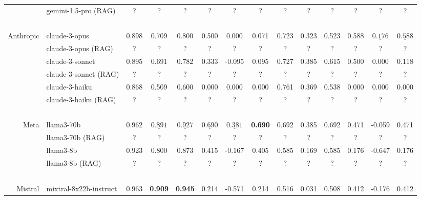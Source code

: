 \begin{table*}[ht]
\begin{tabular}{r|lccc|ccc|ccc|ccc}
        ~       & gemini-1.5-pro (RAG)   & ?              & ?      & ?     & ?     & ?      & ?     & ?     & ?     & ?     & ?     & ?      & ?     \\ 
        ~       & ~                      & ~ & ~ & ~ & ~  & ~ & ~ & ~ & ~ & ~ & ~  & ~ & ~ \\
        Anthropic & claude-3-opus        & 0.898 & 0.709  & 0.800 & 0.500 & 0.000  & 0.071 & 0.723 & 0.323 & 0.523 & 0.588 & $\underline{0.176}$  & $\underline{0.588}$\\ 
        ~         & claude-3-opus (RAG)  & ?              & ?      & ?     & ?     & ?      & ?     & ?     & ?     & ?     & ?     & ?      & ?     \\ 
        ~         & claude-3-sonnet      & 0.895 & 0.691  & 0.782 & 0.333 & -0.095 & 0.095 & 0.727 & 0.385 & 0.615 & 0.500 & 0.000  & 0.118\\ 
         ~        & claude-3-sonnet (RAG)& ?              & ?      & ?     & ?     & ?      & ?     & ?     & ?     & ?     & ?     & ?      & ?     \\ 
        ~         & claude-3-haiku       & 0.868 & 0.509  & 0.600 & 0.000  & 0.000 & 0.000 & 0.761 & 0.369 & 0.538 & 0.000 & 0.000  & 0.000\\ 
         ~        & claude-3-haiku (RAG) & ?              & ?      & ?     & ?     & ?      & ?     & ?     & ?     & ?     & ?     & ?      & ?     \\ 
        ~         & ~                    & ~ & ~ & ~ & ~  & ~ & ~ & ~ & ~ & ~ & ~  & ~ & ~ \\
        Meta    & llama3-70b             & 0.962 & $\underline{0.891}$  & $\underline{0.927}$ & $\underline{0.690}$ & $\underline{0.381}$  & \textbf{0.690} & 0.692 & 0.385 & 0.692 & 0.471 & -0.059 & 0.471\\ 
         ~      & llama3-70b (RAG)       & ?              & ?      & ?     & ?     & ?      & ?     & ?     & ?     & ?     & ?     & ?      & ?     \\ 
        ~       & llama3-8b              & 0.923 & 0.800  & 0.873 & 0.415 & -0.167 & 0.405 & 0.585 & 0.169 & 0.585 & 0.176 & -0.647 & 0.176 \\ 
         ~      & llama3-8b (RAG)        & ?              & ?      & ?     & ?     & ?      & ?     & ?     & ?     & ?     & ?     & ?      & ?     \\ 
        ~       & ~                      & ~ & ~ & ~ & ~  & ~ & ~ & ~ & ~ & ~ & ~  & ~ & ~ \\
        Mistral & mixtral-8x22b-instruct       & $\underline{0.963}$ & \textbf{0.909}  & \textbf{0.945} & 0.214 & -0.571 & 0.214 & 0.516 & 0.031 & 0.508 & 0.412 & -0.176 & 0.412\\ 

\end{tabular}
\end{table*}
